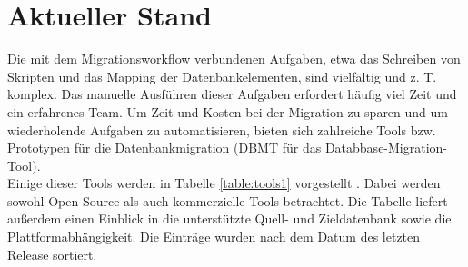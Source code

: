 \section{Aktueller Stand}
\label{verwandte}
Die mit dem Migrationsworkflow verbundenen Aufgaben, etwa das Schreiben von Skripten und das Mapping der Datenbankelementen, sind vielfältig und z. T. komplex. Das manuelle Ausführen dieser Aufgaben erfordert häufig viel Zeit und ein erfahrenes Team. Um Zeit und Kosten bei der Migration zu sparen und um wiederholende Aufgaben zu automatisieren, bieten sich zahlreiche Tools bzw. Prototypen für die Datenbankmigration (DBMT für das Databbase-Migration-Tool). \\
Einige dieser Tools werden in Tabelle \ref{table:tools1} vorgestellt \cite{horstmann2005migration}. Dabei werden sowohl Open-Source als auch kommerzielle Tools betrachtet. Die Tabelle liefert außerdem einen Einblick in die unterstützte Quell- und Zieldatenbank sowie die Plattformabhängigkeit. Die Einträge wurden nach dem Datum des letzten Release sortiert.
 

